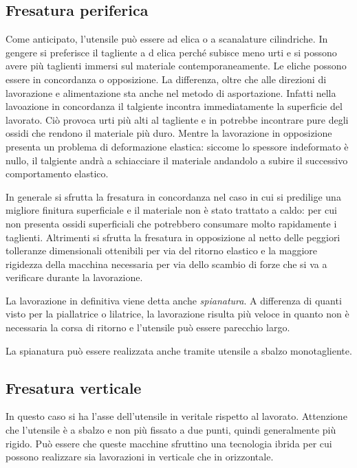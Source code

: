 \subsection{Fresatura periferica}
Come anticipato, l'utensile può essere ad elica o a scanalature cilindriche. In gengere si preferisce 
il tagliente a d elica perché subisce meno urti e si possono avere più taglienti immersi sul materiale
contemporaneamente. 
Le eliche possono essere in concordanza o opposizione.
La differenza, oltre che alle direzioni di lavorazione e alimentazione sta anche nel metodo di asportazione.
Infatti nella lavoazione in concordanza il talgiente incontra immediatamente la superficie del lavorato.
Ciò provoca urti più alti al tagliente e in potrebbe incontrare pure degli ossidi che rendono il materiale
più duro.
Mentre la lavorazione in opposizione presenta un problema di deformazione elastica: siccome lo spessore 
indeformato è nullo, il talgiente andrà a schiacciare il materiale andandolo a subire il successivo 
comportamento elastico.

In generale si sfrutta la fresatura in concordanza nel caso in cui si predilige una migliore finitura 
superficiale e il materiale non è stato trattato a caldo: per cui non presenta ossidi superficiali che 
potrebbero consumare molto rapidamente i taglienti.
Altrimenti si sfrutta la fresatura in opposizione al netto delle peggiori tolleranze dimensionali ottenibili 
per via del ritorno elastico e la maggiore rigidezza della macchina necessaria per via dello scambio di 
forze che si va a verificare durante la lavorazione.

La lavorazione in definitiva viene detta anche \emph{spianatura}. 
A differenza di quanti visto per la piallatrice o lilatrice, la lavorazione risulta più veloce in quanto
non è necessaria la corsa di ritorno e l'utensile può essere parecchio largo.

La spianatura può essere realizzata anche tramite utensile a sbalzo monotagliente.

\subsection{Fresatura verticale}
In questo caso si ha l'asse dell'utensile in veritale rispetto al lavorato. 
Attenzione che l'utensile è a sbalzo e non più fissato a due punti, quindi generalmente più rigido.
Può essere che queste macchine sfruttino una tecnologia ibrida per cui possono realizzare sia lavorazioni
in verticale che in orizzontale.

